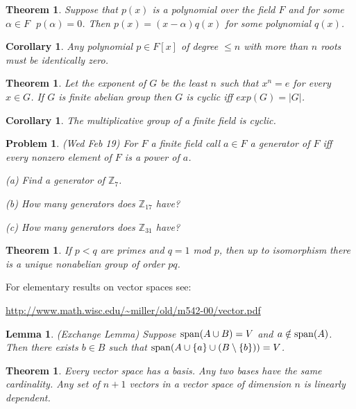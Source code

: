 \documentclass[12pt]{article}
\def\span{{\rm span}}
\def\al{\alpha}
\def\zz{{\mathbb Z}}
\def\al{\alpha}
\def\span{{ \rm span }}
\def\sm{\setminus}
\newtheorem{thm}[theorem]{Theorem}
\newtheorem{lemma}[theorem]{Lemma}
\newtheorem{cor}[theorem]{Corollary}
\newtheorem{prob}{Problem}
\begin{document}
\begin{thm}
Suppose that $p(x)$ is a polynomial over the field $F$ and for some $\al\in F$
$\;p(\al)=0$.  Then $p(x)=(x-\al)q(x)$ for
some polynomial $q(x)$.
\end{thm}

\begin{cor}
Any polynomial $p\in F[x]$ of degree $\leq n$ with more than $n$ roots
must be identically zero.
\end{cor}

\begin{thm}
Let the exponent of $G$ be the least $n$ such that
$x^n=e$ for every $x\in G$.  If $G$ is finite abelian group then 
$G$ is cyclic iff $exp(G)=|G|$.
\end{thm}

\begin{cor}
The multiplicative group of a finite field is cyclic.
\end{cor}

\begin{prob}(Wed Feb 19)
For $F$ a finite field call $a\in F$ a generator of $F$ iff
every nonzero element of $F$ is a power of $a$.
\par (a) Find a generator of $\zz_7$.
\par (b) How many generators does $\zz_{17}$ have?
\par (c) How many generators does $\zz_{31}$ have?
\end{prob}

\begin{thm}
If $p<q$ are primes and $q=1$ mod $p$, then up to isomorphism
there is a unique nonabelian group of order $pq$.
\end{thm}


For elementary results on vector spaces see:

\url{http://www.math.wisc.edu/~miller/old/m542-00/vector.pdf}



\begin{lemma}
(Exchange Lemma) Suppose $\span(A\cup B)=V$ and $a\notin \span(A)$.
Then there exists $b\in B$ such that $\span(A\cup\{a\}\cup(B\sm\{b\}))=V$.
\end{lemma}

\begin{thm}
Every vector space has a basis.  Any two bases have the
same cardinality.  Any set of $n+1$ vectors in a vector
space of dimension $n$ is linearly dependent.
\end{thm}
\end{document}
